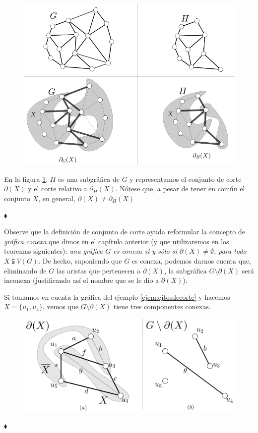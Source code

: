 \begin{ejem}\label{ejem:relativos}
\begin{figure}[H]
\vspace{-2cm}
    \centering
    \includegraphics[scale=0.6]{img/imgchapter2/cortesrelativos.jpg}
    \caption{}
    \label{fig:corterelativo}
\end{figure}
En la figura \ref{fig:corterelativo}, $H$ es una subgráfica de $G$ y representamos el conjunto de corte $\partial(X)$ y el corte relativo a $\partial_{H}(X)$. Nótese que, a pesar de tener en común el conjunto $X$, en general, $\partial(X) \neq \partial_{H}(X)$

\hfill $\blacklozenge$
\end{ejem}
Observe que la definición de conjunto de corte ayuda reformular la concepto de \textit{gráfica conexa} que dimos en el capítulo anterior (y que utilizaremos en los teoremas siguientes): \textit{una gráfica $G$ es conexa si y sólo si $\partial(X) \neq \emptyset$, para todo $X \subsetneqq V(G)$}. De hecho, suponiendo que $G$ es conexa, podemos darnos cuenta que, eliminando de $G$ las aristas que pertenecen a $\partial(X)$, la subgráfica $G\setminus \partial(X)$ será inconexa (justificando así el nombre que se le dio a $\partial(X)$). 
\begin{ejem}
Si tomamos en cuenta la gráfica del ejemplo \ref{ejem:cjtosdecorte} y hacemos $X=\{u_{1},u_{4}\}$, vemos que $G\setminus \partial(X)$ tiene tres componentes conexas.
\begin{figure}[H]
     \centering
     \includegraphics[scale=0.2]{img/imgchapter2/cortescompconexas.jpg}
     \caption{}
     \label{fig:cortescompconexas}
\end{figure}
\hfill $\blacklozenge$
\end{ejem}
